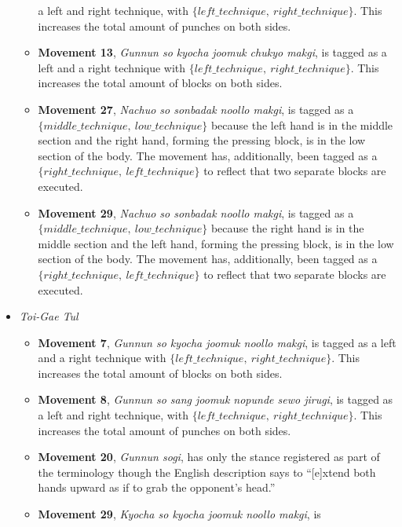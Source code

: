 \documentclass[10pt,twocolumn,a4paper]{article}
\begin{document}
\begin{itemize}
\begin{itemize}
        a left and right technique, with $\{left\_technique, \:
        right\_technique\}$. This increases the total amount of punches on
        both sides.
      \item
        {\bf Movement 13}, \emph{Gunnun so kyocha joomuk chukyo makgi}, is
        tagged as a left and a right technique with $\{left\_technique, \:
        right\_technique\}$. This increases the total amount of blocks on both
        sides.
      \item
        {\bf Movement 27}, \emph{Nachuo so sonbadak noollo makgi}, is tagged as
        a $\{middle\_technique, \: low\_technique\}$ because the left hand is
        in the middle section and the right hand, forming the pressing block,
        is in the low section of the body. The movement has, additionally, been
        tagged as a $\{right\_technique, \: left\_technique\}$ to reflect that
        two separate blocks are executed.
      \item
        {\bf Movement 29}, \emph{Nachuo so sonbadak noollo makgi}, is tagged as
        a $\{middle\_technique, \: low\_technique\}$ because the right hand is
        in the middle section and the left hand, forming the pressing block, is
        in the low section of the body. The movement has, additionally, been
        tagged as a $\{right\_technique, \: left\_technique\}$ to reflect that
        two separate blocks are executed.
    \end{itemize}
  \item
    \emph{Toi-Gae Tul}
    \begin{itemize}
      \item
        {\bf Movement 7}, \emph{Gunnun so kyocha joomuk noollo makgi}, is
        tagged as a left and a right technique with $\{left\_technique, \:
        right\_technique\}$. This increases the total amount of blocks on both
        sides.
      \item
        {\bf Movement 8}, \emph{Gunnun so sang joomuk nopunde sewo jirugi}, is
        tagged as a left and right technique, with $\{left\_technique, \:
        right\_technique\}$. This increases the total amount of punches on
        both sides.
      \item
        {\bf Movement 20}, \emph{Gunnun sogi}, has only the stance registered
        as part of the terminology though the English description says to
        ``[e]xtend both hands upward as if to grab the opponent's head.''
      \item
        {\bf Movement 29}, \emph{Kyocha so kyocha joomuk noollo makgi}, is

\end{itemize}
\end{itemize}
\end{document}
